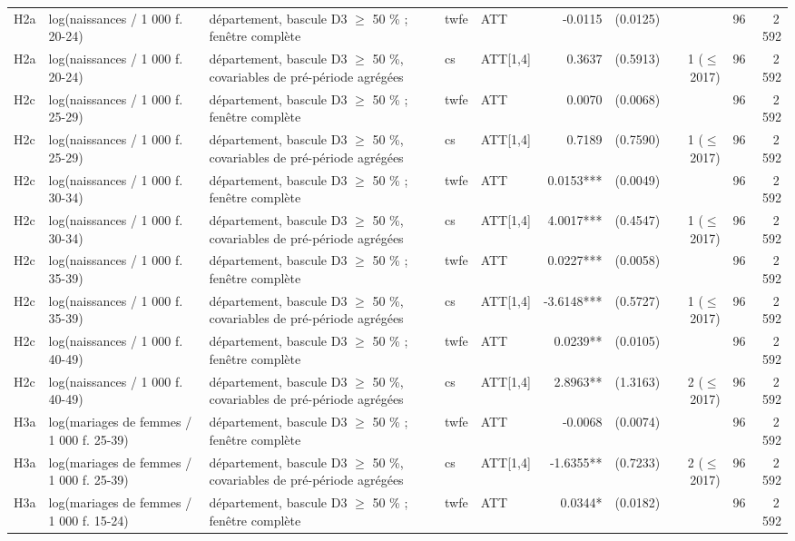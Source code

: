 \begin{table}
\begin{threeparttable}
\begin{tabular}{lp{3.8cm}p{4.6cm}lp{3.5cm}rrrrr}
H2a & log(naissances / 1 000 f. 20-24) & département, bascule D3 $\geq$ 50 \% ; fenêtre complète & twfe & ATT & -0.0115 & (0.0125) &  & 96 & 2\,592 \\
H2a & log(naissances / 1 000 f. 20-24) & département, bascule D3 $\geq$ 50 \%, covariables de pré-période agrégées & cs & ATT[1,4] & 0.3637 & (0.5913) & 1 ($\leq$ 2017) & 96 & 2\,592 \\
H2c & log(naissances / 1 000 f. 25-29) & département, bascule D3 $\geq$ 50 \% ; fenêtre complète & twfe & ATT & 0.0070 & (0.0068) &  & 96 & 2\,592 \\
H2c & log(naissances / 1 000 f. 25-29) & département, bascule D3 $\geq$ 50 \%, covariables de pré-période agrégées & cs & ATT[1,4] & 0.7189 & (0.7590) & 1 ($\leq$ 2017) & 96 & 2\,592 \\
H2c & log(naissances / 1 000 f. 30-34) & département, bascule D3 $\geq$ 50 \% ; fenêtre complète & twfe & ATT & 0.0153*** & (0.0049) &  & 96 & 2\,592 \\
H2c & log(naissances / 1 000 f. 30-34) & département, bascule D3 $\geq$ 50 \%, covariables de pré-période agrégées & cs & ATT[1,4] & 4.0017*** & (0.4547) & 1 ($\leq$ 2017) & 96 & 2\,592 \\
H2c & log(naissances / 1 000 f. 35-39) & département, bascule D3 $\geq$ 50 \% ; fenêtre complète & twfe & ATT & 0.0227*** & (0.0058) &  & 96 & 2\,592 \\
H2c & log(naissances / 1 000 f. 35-39) & département, bascule D3 $\geq$ 50 \%, covariables de pré-période agrégées & cs & ATT[1,4] & -3.6148*** & (0.5727) & 1 ($\leq$ 2017) & 96 & 2\,592 \\
H2c & log(naissances / 1 000 f. 40-49) & département, bascule D3 $\geq$ 50 \% ; fenêtre complète & twfe & ATT & 0.0239** & (0.0105) &  & 96 & 2\,592 \\
H2c & log(naissances / 1 000 f. 40-49) & département, bascule D3 $\geq$ 50 \%, covariables de pré-période agrégées & cs & ATT[1,4] & 2.8963** & (1.3163) & 2 ($\leq$ 2017) & 96 & 2\,592 \\
H3a & log(mariages de femmes / 1 000 f. 25-39) & département, bascule D3 $\geq$ 50 \% ; fenêtre complète & twfe & ATT & -0.0068 & (0.0074) &  & 96 & 2\,592 \\
H3a & log(mariages de femmes / 1 000 f. 25-39) & département, bascule D3 $\geq$ 50 \%, covariables de pré-période agrégées & cs & ATT[1,4] & -1.6355** & (0.7233) & 2 ($\leq$ 2017) & 96 & 2\,592 \\
H3a & log(mariages de femmes / 1 000 f. 15-24) & département, bascule D3 $\geq$ 50 \% ; fenêtre complète & twfe & ATT & 0.0344* & (0.0182) &  & 96 & 2\,592 \\

\end{tabular}
\end{threeparttable}
\end{table}
